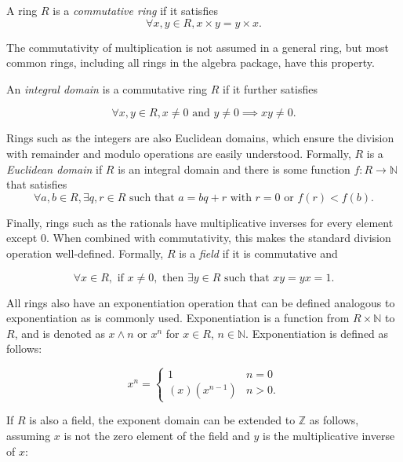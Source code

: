 \documentclass{article}
\theoremstyle{definition}
\DeclareMathOperator{\pow}{\wedge}
\begin{document}
A ring $R$ is a \emph{commutative ring} if it satisfies
\begin{equation*}
        \forall x,y \in R, x \times y = y \times x.
\end{equation*}

The commutativity of multiplication is not assumed in a general ring, but most common rings, including all rings in the algebra package, have this property.

An \emph{integral domain} is a commutative ring $R$ if it further satisfies

\begin{equation*}
        \forall x,y \in R, x \neq 0 \text{ and } y \neq 0 \implies xy \neq 0.
\end{equation*}

Rings such as the integers are also Euclidean domains, which ensure the division with remainder and modulo operations are easily understood. Formally, $R$ is a \emph{Euclidean domain} if $R$ is an integral domain and there is some function $f: R \to \mathbb{N}$ that satisfies
\begin{equation*}
    \forall a, b \in R, \exists q,r \in R \text{ such that } a = bq + r \text{ with } r = 0 \text{ or } f(r) < f(b).  
\end{equation*}

Finally, rings such as the rationals have multiplicative inverses for every element except $0$. When combined with commutativity, this makes the standard division operation well-defined. Formally, $R$ is a \emph{field} if it is commutative and

\[ \forall x \in R, \text{ if } x \neq 0, \text{ then } \exists y \in R \text{ such that } xy=yx=1.\] 

All rings also have an exponentiation operation that can be defined analogous to exponentiation as is commonly used. Exponentiation is a function from $R \times \mathbb{N}$ to $R$, and is denoted as $x \pow n$ or $x^n$ for $x \in R$, $n \in \mathbb{N}$. Exponentiation is defined as follows:

\begin{equation*}
    x^n = \begin{cases} 1 & n = 0\\
                (x)(x^{n-1}) & n > 0.
                \end{cases}
\end{equation*}

If $R$ is also a field, the exponent domain can be extended to $\mathbb{Z}$ as follows, assuming $x$ is not the zero element of the field and $y$ is the multiplicative inverse of $x$:
\end{document}
